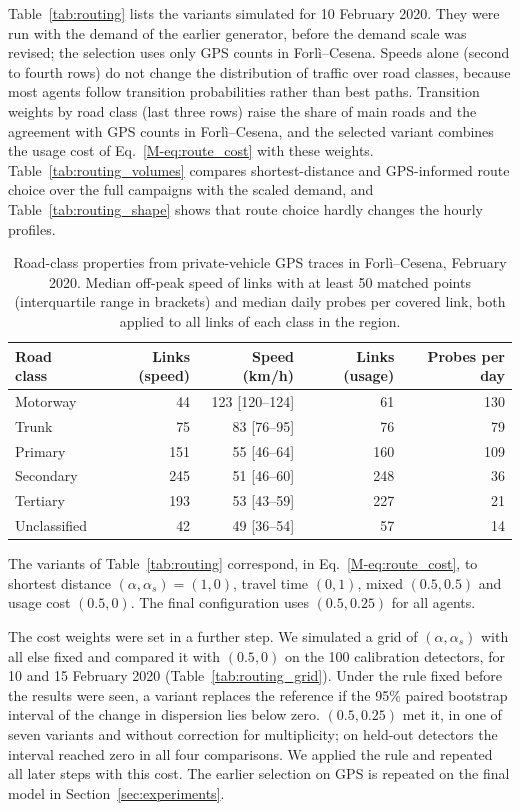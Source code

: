 \documentclass[11pt,a4paper]{article}
\begin{document}
Table~\ref{tab:routing} lists the variants simulated for 10 February 2020. They were run with the demand of the earlier generator, before the demand scale was revised; the selection uses only GPS counts in Forl\`i--Cesena. Speeds alone (second to fourth rows) do not change the distribution of traffic over road classes, because most agents follow transition probabilities rather than best paths. Transition weights by road class (last three rows) raise the share of main roads and the agreement with GPS counts in Forl\`i--Cesena, and the selected variant combines the usage cost of Eq.~\eqref{M-eq:route_cost} with these weights. Table~\ref{tab:routing_volumes} compares shortest-distance and GPS-informed route choice over the full campaigns with the scaled demand, and Table~\ref{tab:routing_shape} shows that route choice hardly changes the hourly profiles.

\begin{table}[htbp]\centering
\caption{Road-class properties from private-vehicle GPS traces in Forl\`i--Cesena, February 2020. Median off-peak speed of links with at least 50 matched points (interquartile range in brackets) and median daily probes per covered link, both applied to all links of each class in the region.}
\label{tab:classes}
\begin{tabular}{@{}lrrrr@{}}
\toprule
Road class & Links (speed) & Speed (km/h) & Links (usage) & Probes per day \\
\midrule
Motorway & 44 & 123 [120--124] & 61 & 130 \\
Trunk & 75 & 83 [76--95] & 76 & 79 \\
Primary & 151 & 55 [46--64] & 160 & 109 \\
Secondary & 245 & 51 [46--60] & 248 & 36 \\
Tertiary & 193 & 53 [43--59] & 227 & 21 \\
Unclassified & 42 & 49 [36--54] & 57 & 14 \\
\bottomrule
\end{tabular}
\end{table}

The variants of Table~\ref{tab:routing} correspond, in Eq.~\eqref{M-eq:route_cost}, to shortest distance $(\alpha,\alpha_s)=(1,0)$, travel time $(0,1)$, mixed $(0.5,0.5)$ and usage cost $(0.5,0)$. The final configuration uses $(0.5,0.25)$ for all agents.

The cost weights were set in a further step. We simulated a grid of $(\alpha,\alpha_s)$ with all else fixed and compared it with $(0.5,0)$ on the 100 calibration detectors, for 10 and 15 February 2020 (Table~\ref{tab:routing_grid}). Under the rule fixed before the results were seen, a variant replaces the reference if the 95\% paired bootstrap interval of the change in dispersion lies below zero. $(0.5,0.25)$ met it, in one of seven variants and without correction for multiplicity; on held-out detectors the interval reached zero in all four comparisons. We applied the rule and repeated all later steps with this cost. The earlier selection on GPS is repeated on the final model in Section~\ref{sec:experiments}.
\end{document}
